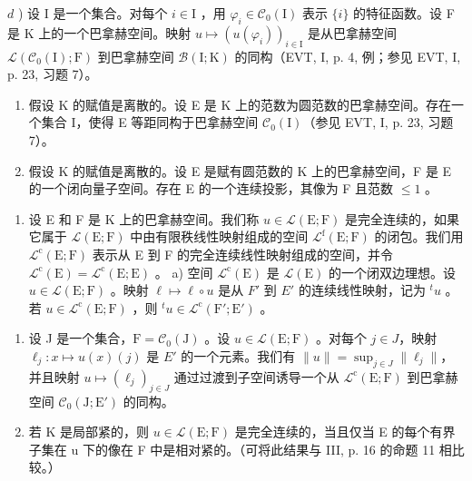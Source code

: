 \(d\) ) 设 I 是一个集合。对每个 \(i\in \mathrm{I}\) ，用 \(\varphi_{i}\in \mathcal{C}_{0}(\mathrm{I})\) 表示 \(\{i\}\) 的特征函数。设 F 是 K 上的一个巴拿赫空间。映射 \(u \mapsto (u(\varphi_i))_{i \in \mathrm{I}}\) 是从巴拿赫空间 \(\mathcal{L}(\mathcal{C}_0(\mathrm{I});\mathrm{F})\) 到巴拿赫空间 \(\mathcal{B}(\mathrm{I};\mathrm{K})\) 的同构（EVT, I, p. 4, 例；参见 EVT, I, p. 23, 习题 7）。

\begin{enumerate}
\def\labelenumi{\alph{enumi})}
\setcounter{enumi}{4}
\item
  假设 K 的赋值是离散的。设 E 是 K 上的范数为圆范数的巴拿赫空间。存在一个集合 I，使得 E 等距同构于巴拿赫空间 \(\mathcal{C}_{0}(\mathrm{I})\)（参见 EVT, I, p. 23, 习题 7）。
\item
  假设 K 的赋值是离散的。设 E 是赋有圆范数的 K 上的巴拿赫空间，F 是 E 的一个闭向量子空间。存在 E 的一个连续投影，其像为 F 且范数 \(\leqslant 1\) 。
\end{enumerate}

\begin{enumerate}
\def\labelenumi{\arabic{enumi})}
\setcounter{enumi}{1}
\tightlist
\item
  设 E 和 F 是 K 上的巴拿赫空间。我们称 \(u \in \mathcal{L}(\mathrm{E};\mathrm{F})\) 是完全连续的，如果它属于 \(\mathcal{L}(\mathrm{E};\mathrm{F})\) 中由有限秩线性映射组成的空间 \(\mathcal{L}^{\mathrm{f}}(\mathrm{E};\mathrm{F})\) 的闭包。我们用 \(\mathcal{L}^{\mathrm{c}}(\mathrm{E};\mathrm{F})\) 表示从 E 到 F 的完全连续线性映射组成的空间，并令 \(\mathcal{L}^{\mathrm{c}}(\mathrm{E}) = \mathcal{L}^{\mathrm{c}}(\mathrm{E};\mathrm{E})\) 。 a) 空间 \(\mathcal{L}^{\mathrm{c}}(\mathrm{E})\) 是 \(\mathcal{L}(\mathrm{E})\) 的一个闭双边理想。设 \(u \in \mathcal{L}(\mathrm{E};\mathrm{F})\) 。映射 \(\ell \mapsto \ell \circ u\) 是从 \(F'\) 到 \(E'\) 的连续线性映射，记为 \({}^{t}u\) 。若 \(u \in \mathcal{L}^{\mathrm{c}}(\mathrm{E};\mathrm{F})\) ，则 \({}^{t}u \in \mathcal{L}^{\mathrm{c}}(\mathrm{F}'; \mathrm{E}')\) 。
\end{enumerate}

\begin{enumerate}
\def\labelenumi{\alph{enumi})}
\setcounter{enumi}{1}
\item
  设 J 是一个集合，\(\mathrm{F} = \mathcal{C}_{0}(\mathrm{J})\) 。设 \(u \in \mathcal{L}(\mathrm{E};\mathrm{F})\) 。对每个 \(j \in J\)，映射 \(\ell_{j} \colon x \mapsto u(x)(j)\) 是 \(E'\) 的一个元素。我们有 \(\|u\| = \sup_{j \in J} \| \ell_{j} \|\)，并且映射 \(u \mapsto (\ell_{j})_{j \in J}\) 通过过渡到子空间诱导一个从 \(\mathcal{L}^{\mathrm{c}}(\mathrm{E};\mathrm{F})\) 到巴拿赫空间 \(\mathcal{C}_{0}(\mathrm{J};\mathrm{E}')\) 的同构。
\item
  若 K 是局部紧的，则 \(u \in \mathcal{L}(\mathrm{E}; \mathrm{F})\) 是完全连续的，当且仅当 E 的每个有界子集在 u 下的像在 F 中是相对紧的。（可将此结果与 III, p. 16 的命题 11 相比较。）
\end{enumerate}

